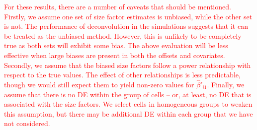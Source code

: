 \documentclass{article}
\newcommand\revised[1]{\textcolor{red}{#1}}
\begin{document}
\revised{For these results, there are a number of caveats that should be mentioned. 
Firstly, we assume one set of size factor estimates is unbiased, while the other set is not.
The performance of deconvolution in the simulations suggests that it can be treated as the unbiased method.
However, this is unlikely to be completely true as both sets will exhibit some bias.
The above evaluation will be less effective when large biases are present in both the offsets and covariates.
Secondly, we assume that the biased size factors follow a power relationship with respect to the true values.
The effect of other relationships is less predictable, though we would still expect them to yield non-zero values for $\hat\beta'_{i1}$.
Finally, we assume that there is no DE within the group of cells -- or, at least, no DE that is associated with the size factors.
We select cells in homogeneous groups to weaken this assumption, but there may be additional DE within each group that we have not considered.
}
\end{document}
